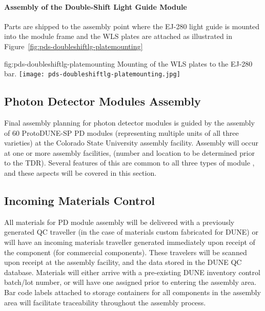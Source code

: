 \paragraph*{Assembly of the Double-Shift Light Guide Module}

Parts are shipped to the assembly point where the EJ-280 light guide is mounted into the module frame and the WLS plates are attached as illustrated in Figure~\ref{fig:pds-doubleshiftlg-platemounting}

\begin{dunefigure}{fig:pds-doubleshiftlg-platemounting}
{Mounting of the WLS plates to the EJ-280 bar.}
  \texttt{[image: pds-doubleshiftlg-platemounting.jpg]}
\end{dunefigure}



\subsection{Photon Detector Modules Assembly}

Final assembly planning for photon detector modules is guided by the assembly of \num{60} ProtoDUNE-SP PD modules (representing multiple units of all three varieties) at the Colorado State University assembly facility.  Assembly will occur at one or more assembly facilities, (number and location to be determined prior to the TDR).  Several features of this are common to all three types of module , and these aspects will be covered in this section.

\subsection{Incoming Materials Control}

All materials for PD module assembly will be delivered with a previously generated QC traveller (in the case of materials custom fabricated for DUNE) or will have an incoming materials traveller generated immediately upon receipt of the component (for commercial components).  These travelers will be scanned upon receipt at the assembly facility, and the data stored in the DUNE QC database.  Materials will either arrive with a pre-existing DUNE inventory control batch/lot number, or will have one assigned prior to entering the assembly area.  Bar code labels attached to storage containers for all components in the assembly area will facilitate traceability throughout the assembly process.

